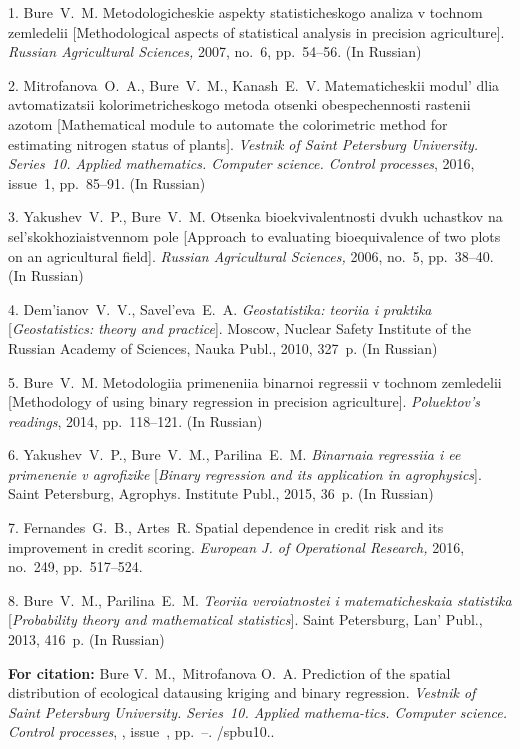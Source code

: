 

{\footnotesize

\vskip 2mm


\vskip 1.5mm



1. {Bure~V.~M.} Metodologicheskie aspekty statisticheskogo analiza
v tochnom zemledelii [Methodological aspects of statistical
analysis in precision agriculture]. {\it Russian Agricultural
Sciences,} 2007, no.~6, pp.~54--56. (In Russian)

2. { Mitrofanova~O.~A., Bure~V.~M., Kanash~E.~V.} Matematicheskii
modul' dlia avtomatizatsii kolorimetricheskogo metoda otsenki
obespechennosti rastenii azotom [Mathematical module to automate
the colorimetric method for estimating nitrogen status of plants].
{\it Vestnik of Saint Petersburg University. Series~10. Applied
mathematics. Computer science. Control processes}, 2016, issue~1,
pp.~85--91. (In Russian)

3. {Yakushev~V.~P., Bure~V.~M.} Otsenka bioekvivalentnosti dvukh
uchastkov na sel'skokhoziaistvennom pole [Approach to evaluating
bioequivalence of two plots on an agricultural field]. {\it
Russian Agricultural Sciences,} 2006, no.~5, pp.~38--40. (In
Russian)

4. {Dem'ianov~V.~V., Savel'eva~E.~A.} {\it Geostatistika: teoriia
i praktika} [{\it Geostatistics: theory and practice}]. Moscow,
Nuclear Safety Institute of the Russian Academy of Sciences, Nauka
Publ., 2010, 327~p. (In Russian)

5. {Bure~V.~M.} Metodologiia primeneniia binarnoi regressii v
tochnom zemledelii [Methodology of using binary regression in
precision agriculture]. {\it Poluektov's readings}, 2014,
pp.~118--121. (In Russian)

6. {Yakushev~V.~P., Bure~V.~M., Parilina~E.~M.} {\it Binarnaia
regressiia i ee primenenie v agrofizike} [{\it Binary regression
and its application in agrophysics}]. Saint Petersburg, Agrophys.
Institute Publ., 2015, 36~p. (In Russian)

7. { Fernandes~G.~B., Artes~R.} Spatial dependence in credit risk
and its improvement in credit scoring. {\it European J. of
Operational Research,} 2016, no.~249, pp.~517--524.

8. {Bure~V.~M., Parilina~E.~M. } {\it Teoriia veroiatnostei i
matematicheskaia statistika} [{\it Probability theory and
mathematical statistics}]. Saint Petersburg, Lan' Publ., 2013,
416~p. (In Russian)




\vskip 2mm

{\bf For citation:} Bure V.~M.,~Mitrofanova O.~A. Prediction of
the spatial distribution of ecological data\linebreak using
kriging and binary regression. {\it Vestnik of Saint Petersburg
University. Series~10. Applied mathema-\linebreak tics. Computer
science. Control processes}, \issueyear, issue~\issuenum,
pp.~\pageref{p9}--\pageref{p9e}.
\doivyp/spbu10.\issueyear.



}

